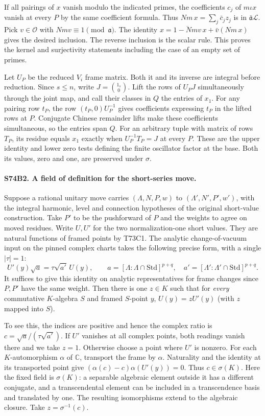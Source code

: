 If all pairings of $x$ vanish modulo the indicated primes, the
coefficients $c_j$ of $m\iota x$ vanish at every $P$ by the same
coefficient formula. Thus $Nm\,x=\sum_j\bar c_j z_j$ is in
$\bar{\mathfrak a}\mathcal L$. Pick $v\in\mathcal O$ with
$Nm v\equiv1\pmod{\mathfrak a}$. The identity
$x=\overline{1-Nm v}\,x+\bar v(Nm\,x)$ gives the desired inclusion.
The reverse inclusion is the scalar rule. This proves the kernel and
surjectivity statements including the case of an empty set of primes.

Let $U_P$ be the reduced $V_i$ frame matrix. Both it and its inverse
are integral before reduction. Since $s\le n$, write
$J=\binom{1_s}{0}$. Lift the rows of $U_PJ$ simultaneously through
the joint map, and call their classes in $Q$ the entries of $x_1$.
For any pairing row $t_P$, the row $(t_P,0)U_P^{-1}$ gives
coefficients expressing $t_P$ in the lifted rows at $P$.
Conjugate Chinese remainder lifts make these coefficients simultaneous,
so the entries span $Q$. For an arbitrary tuple with matrix of rows
$T_P$, its residue equals $x_1$ exactly when $U_P^{-1}T_P=J$ at
every $P$. These are the upper identity and lower zero tests defining
the finite oscillator factor at the base. Both its values, zero and
one, are preserved under $\sigma$.

\paragraph{S74B2. A field of definition for the short-series move.}
Suppose a rational unitary move carries $(\Lambda,N,P,w)$ to
$(\Lambda',N',P',w')$, with the integral harmonic, level and
connection hypotheses of the original short-value construction.
Take $P'$ to be the pushforward of $P$ and the weights to agree on
moved residues. Write $U,U'$ for the two normalization-one short
values. They are natural functions of framed points by T73C1.
The analytic change-of-vacuum input on the pinned complex charts
takes the following precise form, with a single $|\tau|=1$:
\[
 U'(y)\sqrt{a}=\tau\sqrt{a'}\, U(y),\qquad
 a=[\Lambda:\Lambda\cap\mathrm{Std}]^{p+q},\quad
 a'=[\Lambda':\Lambda'\cap\mathrm{Std}]^{p+q}.
\]
It suffices to give this identity on analytic representatives for frame
changes since $P,P'$ have the same weight. Then there is one $z\in K$
such that for \emph{every} commutative $K$-algebra $S$ and framed
$S$-point $y$, $U(y)=zU'(y)$ (with $z$ mapped into $S$).

To see this, the indices are positive and hence the complex ratio is
$c=\sqrt{a}/(\tau\sqrt{a'})$. If $U'$ vanishes at all complex
points, both readings vanish there and we take $z=1$. Otherwise
choose a point where $U'$ is nonzero. For each $K$-automorphism
$\alpha$ of $\mathbb C$, transport the frame by $\alpha$. Naturality
and the identity at its transported point give
$(\alpha(c)-c)\alpha(U'(y))=0$. Thus $c\in\sigma(K)$. Here the
fixed field is $\sigma(K)$: a separable algebraic element outside it
has a different conjugate, and a transcendental element can be
included in a transcendence basis and translated by one. The resulting
isomorphisms extend to the algebraic closure. Take $z=\sigma^{-1}(c)$.

